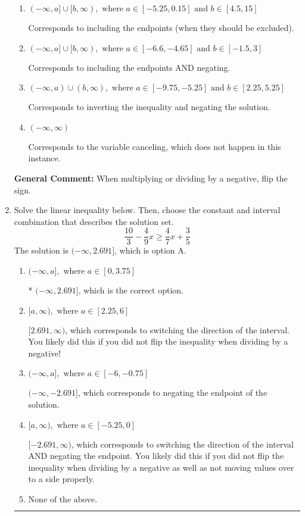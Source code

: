\documentclass{extbook}[14pt]
\newcommand{\litem}[1]{\item #1

\rule{\textwidth}{0.4pt}}
\begin{document}
\begin{enumerate}
{\begin{enumerate}[label=\Alph*.]
 * Correct option.
\item \( (-\infty, a] \cup [b, \infty), \text{ where } a \in [-5.25, 0.15] \text{ and } b \in [4.5, 15] \)

Corresponds to including the endpoints (when they should be excluded).
\item \( (-\infty, a] \cup [b, \infty), \text{ where } a \in [-6.6, -4.65] \text{ and } b \in [-1.5, 3] \)

Corresponds to including the endpoints AND negating.
\item \( (-\infty, a) \cup (b, \infty), \text{ where } a \in [-9.75, -5.25] \text{ and } b \in [2.25, 5.25] \)

Corresponds to inverting the inequality and negating the solution.
\item \( (-\infty, \infty) \)

Corresponds to the variable canceling, which does not happen in this instance.
\end{enumerate}

\textbf{General Comment:} When multiplying or dividing by a negative, flip the sign.
}
\litem{
Solve the linear inequality below. Then, choose the constant and interval combination that describes the solution set.
\[ \frac{10}{3} - \frac{4}{9} x \geq \frac{4}{7} x + \frac{3}{5} \]The solution is \( (-\infty, 2.691] \), which is option A.\begin{enumerate}[label=\Alph*.]
\item \( (-\infty, a], \text{ where } a \in [0, 3.75] \)

* $(-\infty, 2.691]$, which is the correct option.
\item \( [a, \infty), \text{ where } a \in [2.25, 6] \)

 $[2.691, \infty)$, which corresponds to switching the direction of the interval. You likely did this if you did not flip the inequality when dividing by a negative!
\item \( (-\infty, a], \text{ where } a \in [-6, -0.75] \)

 $(-\infty, -2.691]$, which corresponds to negating the endpoint of the solution.
\item \( [a, \infty), \text{ where } a \in [-5.25, 0] \)

 $[-2.691, \infty)$, which corresponds to switching the direction of the interval AND negating the endpoint. You likely did this if you did not flip the inequality when dividing by a negative as well as not moving values over to a side properly.
\item \( \text{None of the above}. \)


\end{enumerate}}
\end{enumerate}
\end{document}
